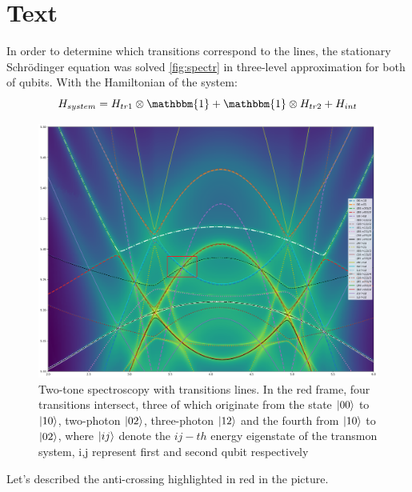 \documentclass[%
 aip,
 amsmath,amssymb,
 reprint,%
]{revtex4-1}
\begin{document}
\section{Text}


In order to determine which transitions correspond to the lines, the stationary Schrödinger equation was solved \autoref{fig:spectr} in three-level approximation for both of qubits. With the Hamiltonian of the system:
\begin{equation}
	H_{system} = H_{tr1}\otimes\mathbbm{1}+\mathbbm{1}\otimes H_{tr2}+H_{int}
\end{equation}
\begin{figure}[h]
	\centering
	\includegraphics[width=\linewidth]{spectr}
	\caption{Two-tone spectroscopy with transitions lines. In the red frame, four transitions intersect, three of which originate from the state $\ket{00}$ to $\ket{10}$, two-photon
		$\ket{02}$, three-photon
		$\ket{12}$ and the fourth from  $\ket{10}$ to  $\ket{02}$, where $\ket{ij}$ denote the $ij-th$ energy eigenstate of the transmon system, i,j represent first and second qubit respectively}
	\label{fig:spectr}
\end{figure}


 Let's described the anti-crossing highlighted in red in the picture. 
 



\end{document}
